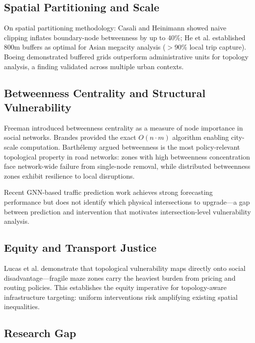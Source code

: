 \documentclass[sigconf, nonacm]{acmart}
\begin{document}
\subsection{Spatial Partitioning and Scale}

On spatial partitioning methodology: Casali and Heinimann \cite{casali2019} showed naive clipping inflates boundary-node betweenness by up to 40\%; He et al. \cite{he2023} established 800m buffers as optimal for Asian megacity analysis ($>$90\% local trip capture). Boeing \cite{boeing2017, boeing2021} demonstrated buffered grids outperform administrative units for topology analysis, a finding validated across multiple urban contexts.

\subsection{Betweenness Centrality and Structural Vulnerability}

Freeman \cite{freeman1977} introduced betweenness centrality as a measure of node importance in social networks. Brandes \cite{brandes2001} provided the exact $O(n \cdot m)$ algorithm enabling city-scale computation. Barthélemy \cite{barthelemy2011} argued betweenness is the most policy-relevant topological property in road networks: zones with high betweenness concentration face network-wide failure from single-node removal, while distributed betweenness zones exhibit resilience to local disruptions.

Recent GNN-based traffic prediction work \cite{ma2023, zhou2022} achieves strong forecasting performance but does not identify which physical intersections to upgrade—a gap between prediction and intervention that motivates intersection-level vulnerability analysis.

\subsection{Equity and Transport Justice}

Lucas et al. \cite{lucas2021} demonstrate that topological vulnerability maps directly onto social disadvantage—fragile maze zones carry the heaviest burden from pricing and routing policies. This establishes the equity imperative for topology-aware infrastructure targeting: uniform interventions risk amplifying existing spatial inequalities.

\subsection{Research Gap}
\end{document}

